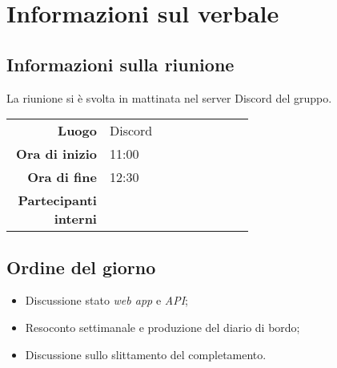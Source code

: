 \section{Informazioni sul verbale}

\subsection{Informazioni sulla riunione}
La riunione si è svolta in mattinata nel server Discord del gruppo.

\begin{center}
	\begin{tabular}{r|p{0.6\linewidth}}
		\toprule
		\textbf{Luogo} & Discord \\
		\textbf{Ora di inizio} & 11:00 \\
		\textbf{Ora di fine} & 12:30 \\
		\textbf{Partecipanti interni} & \groupTeam
	\end{tabular}
\end{center}

\medskip

\subsection{Ordine del giorno}
\begin{itemize}
	\item Discussione stato \textit{web app} e \textit{API};
	\item Resoconto settimanale e produzione del diario di bordo;
	\item Discussione sullo slittamento del completamento.
\end{itemize}